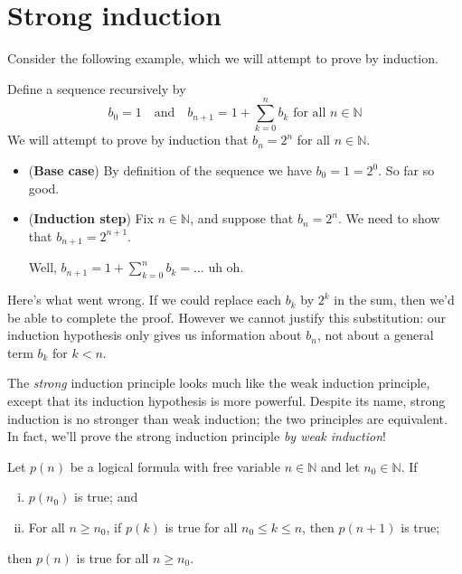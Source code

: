 \section{Strong induction}

Consider the following example, which we will attempt to prove by induction.

\begin{example}
\label{exProofByWeakInductionFail}
Define a sequence recursively by
\[ b_0 = 1 \quad \text{and} \quad b_{n+1} = 1 + \sum_{k=0}^n b_k \text{ for all } n \in \mathbb{N} \]
We will attempt to prove by induction that $b_n = 2^n$ for all $n \in \mathbb{N}$.

\begin{itemize}
\item (\textbf{Base case}) By definition of the sequence we have $b_0=1=2^0$. So far so good.

\item (\textbf{Induction step}) Fix $n \in \mathbb{N}$, and suppose that $b_n = 2^n$. We need to show that $b_{n+1}=2^{n+1}$.

Well, $b_{n+1} = 1 + \sum_{k=0}^n b_k = {\dots}$ uh oh.
\end{itemize}

Here's what went wrong. If we could replace each $b_k$ by $2^k$ in the sum, then we'd be able to complete the proof. However we cannot justify this substitution: our induction hypothesis only gives us information about $b_n$, not about a general term $b_k$ for $k < n$.
\end{example}

The \textit{strong} induction principle looks much like the weak induction principle, except that its induction hypothesis is more powerful. Despite its name, strong induction is no stronger than weak induction; the two principles are equivalent. In fact, we'll prove the strong induction principle \textit{by weak induction}!

\begin{theorem}
\label{thmStrongInduction}
Let $p(n)$ be a logical formula with free variable $n \in \mathbb{N}$ and let $n_0 \in \mathbb{N}$. If
\begin{enumerate}[(i)]
\item $p(n_0)$ is true; and
\item For all $n \ge n_0$, if $p(k)$ is true for all $n_0 \le k \le n$, then $p(n+1)$ is true;
\end{enumerate}
then $p(n)$ is true for all $n \ge n_0$.
\end{theorem}

